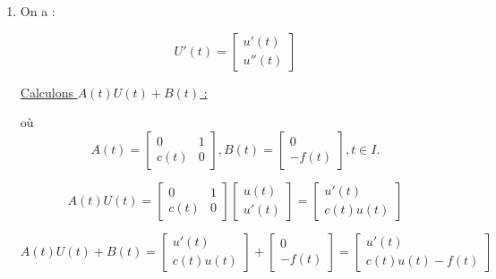 \documentclass[12pt, letterpaper]{article}
\begin{document}
\begin{enumerate}

\item On a :

  \begin{equation*}
    U'(t) = \left[
    \begin{array}{l}
      u'(t) \\
      u''(t)
    \end{array}
    \right]
  \end{equation*}

  \underline{Calculons $A(t)U(t)+B(t)$ :}

  où \begin{equation*}
    A(t) = \left[
    \begin{array}{ll}
      0 & 1\\
      c(t) & 0
    \end{array}
    \right]
    ,
    B(t) = \left[
    \begin{array}{l}
      0 \\
      -f(t)
    \end{array}
    \right]
  , t \in I.
  \end{equation*}
  
  \begin{equation*}
    A(t)U(t) = \left[
    \begin{array}{ll}
      0 & 1\\
      c(t) & 0
    \end{array}
    \right]
    \left[
    \begin{array}{l}
      u(t) \\
      u'(t)
    \end{array}
    \right]
    =
    \left[
    \begin{array}{l}
      u'(t) \\
      c(t)u(t)
    \end{array}
    \right]
  \end{equation*}

  \begin{equation*}
    A(t)U(t) + B(t) =
    \left[
    \begin{array}{l}
      u'(t) \\
      c(t)u(t)
    \end{array}
    \right]
    +
    \left[
    \begin{array}{l}
      0 \\
      -f(t)
    \end{array}
    \right]
    =
    \left[
    \begin{array}{l}
      u'(t) \\
      c(t)u(t) - f(t)
    \end{array}
    \right]
  \end{equation*}


\end{enumerate}
\end{document}
